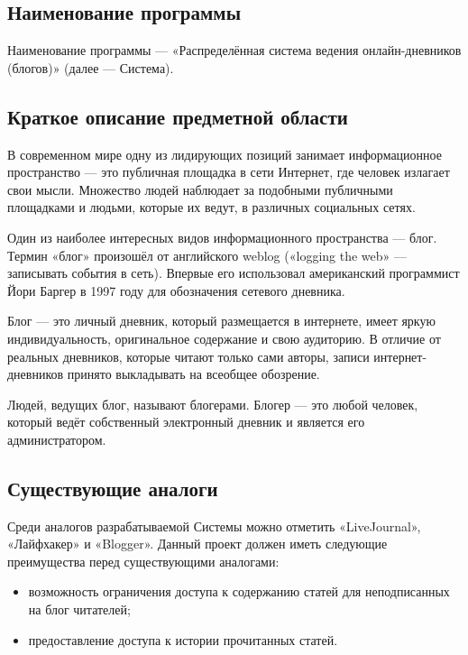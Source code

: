 \documentclass{bmstu-gost-7-32}
\begin{document}
\subsection{Наименование программы}

Наименование программы — «Распределённая система ведения онлайн-дневников (блогов)» (далее — Система).

\subsection{Краткое описание предметной области}

В современном мире одну из лидирующих позиций занимает информационное пространство — это публичная площадка в сети Интернет, где человек излагает свои мысли.
Множество людей наблюдает за подобными публичными площадками и людьми, которые их ведут, в различных социальных сетях.

Один из наиболее интересных видов информационного пространства — блог.
Термин «блог» произошёл от английского weblog («logging the web» — записывать события в сеть).
Впервые его использовал американский программист Йори Баргер в 1997 году для обозначения сетевого дневника.

Блог — это личный дневник, который размещается в интернете, имеет яркую индивидуальность, оригинальное содержание и свою аудиторию.
В отличие от реальных дневников, которые читают только сами авторы, записи интернет-дневников принято выкладывать на всеобщее обозрение.

Людей, ведущих блог, называют блогерами.
Блогер — это любой человек, который ведёт собственный электронный дневник и является его администратором.

\subsection{Существующие аналоги}

Среди аналогов разрабатываемой Системы можно отметить «LiveJournal», «Лайфхакер» и «Blogger».
Данный проект должен иметь следующие преимущества перед существующими аналогами:
\begin{itemize}
	\item возможность ограничения доступа к содержанию статей для неподписанных на блог читателей;
	\item предоставление доступа к истории прочитанных статей.
\end{itemize}
\end{document}
